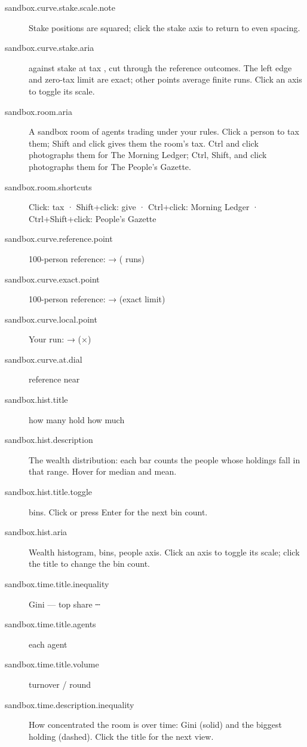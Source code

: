 \begin{description}
  \item[sandbox.curve.stake.scale.note] Stake positions are squared; click the stake axis to return to even spacing.
  \item[sandbox.curve.stake.aria]  against stake at tax , cut through the reference outcomes. The left edge and zero-tax limit are exact; other points average finite runs. Click an axis to toggle its scale.
  \item[sandbox.room.aria] A sandbox room of  agents trading under your rules. Click a person to tax them; Shift and click gives them the room's tax. Ctrl and click photographs them for The Morning Ledger; Ctrl, Shift, and click photographs them for The People's Gazette.
  \item[sandbox.room.shortcuts] Click: tax · Shift+click: give · Ctrl+click: Morning Ledger · Ctrl+Shift+click: People's Gazette
  \item[sandbox.curve.reference.point] 100-person reference:   →   ( runs)
  \item[sandbox.curve.exact.point] 100-person reference:   →   (exact limit)
  \item[sandbox.curve.local.point] Your run:   →   (×)
  \item[sandbox.curve.at.dial] reference near 
  \item[sandbox.hist.title] how many hold how much
  \item[sandbox.hist.description] The wealth distribution: each bar counts the people whose holdings fall in that range. Hover for median and mean.
  \item[sandbox.hist.title.toggle]  bins. Click or press Enter for the next bin count.
  \item[sandbox.hist.aria] Wealth histogram,   bins,  people axis. Click an axis to toggle its scale; click the title to change the bin count.
  \item[sandbox.time.title.inequality] Gini — top share ┄
  \item[sandbox.time.title.agents] each agent
  \item[sandbox.time.title.volume] turnover / round
  \item[sandbox.time.description.inequality] How concentrated the room is over time: Gini (solid) and the biggest holding (dashed). Click the title for the next view.

\end{description}
